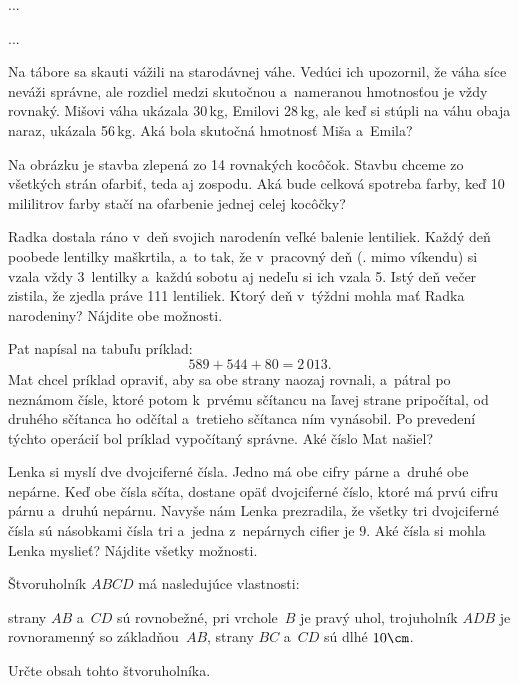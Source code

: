 {%
...}

{%
...}

{%
Na tábore sa skauti vážili na starodávnej váhe. Vedúci ich upozornil, že váha síce neváži správne, ale rozdiel medzi skutočnou a~nameranou hmotnosťou je vždy rovnaký. Mišovi váha ukázala 30\,kg, Emilovi 28\,kg, ale keď si stúpli na váhu obaja naraz, ukázala 56\,kg. Aká bola skutočná hmotnosť Miša a~Emila?}

{%
Na \ifobrazkyvedla{}obrázku\else\obr{}\fi{} je stavba zlepená zo 14 rovnakých kocôčok. Stavbu chceme zo všetkých
strán ofarbiť, teda aj zospodu. Aká bude celková spotreba farby, keď 10 mililitrov farby stačí na ofarbenie jednej celej kocôčky?
\ifobrazkyvedla\else{}\fi%
}

{%
Radka dostala ráno v~deň svojich narodenín veľké balenie lentiliek. Každý deň poobede lentilky maškrtila, a~to tak, že v~pracovný deň (\tj. mimo víkendu) si vzala vždy 3~lentilky a~každú sobotu aj nedeľu si ich vzala 5. Istý deň večer zistila, že zjedla práve 111 lentiliek. Ktorý deň v~týždni mohla mať Radka narodeniny? Nájdite obe možnosti.}

{%
Pat napísal na tabuľu príklad:
$$
589+544+80=2\,013.
$$
Mat chcel príklad opraviť, aby sa obe strany naozaj rovnali,
a~pátral po neznámom čísle, ktoré potom k~prvému sčítancu na ľavej strane
pripočítal, od druhého sčítanca ho odčítal a~tretieho sčítanca ním
vynásobil. Po prevedení týchto operácií bol príklad vypočítaný správne.
Aké číslo Mat našiel?
}

{%
Lenka si myslí dve dvojciferné čísla. Jedno má obe cifry párne a~druhé obe nepárne.
Keď obe čísla sčíta, dostane opäť dvojciferné číslo, ktoré má prvú cifru
párnu a~druhú nepárnu. Navyše nám Lenka prezradila, že všetky tri dvojciferné čísla
sú násobkami čísla tri a~jedna z~nepárnych cifier je $9$.
Aké čísla si mohla Lenka myslieť? Nájdite všetky možnosti.
}

{%
Štvoruholník $ABCD$ má nasledujúce vlastnosti:
\begin{itemize}
  \iitem strany $AB$ a~$CD$ sú rovnobežné,
  \iitem pri vrchole~$B$ je pravý uhol,
  \iitem trojuholník $ADB$ je rovnoramenný so základňou~$AB$,
  \iitem strany $BC$ a~$CD$ sú dlhé $10\cm$.
\end{itemize}
Určte obsah tohto štvoruholníka.
}

